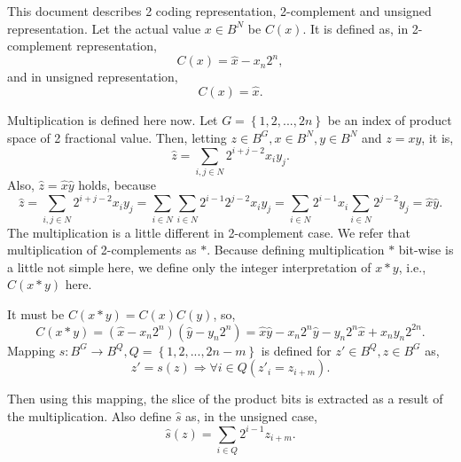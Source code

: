 \documentclass[a4paper]{article}
\newcommand{\eqlabel}[1]{\label{#1}
}
\newcommand{\br}[1]{\left(#1\right)}
\newcommand{\cbr}[1]{\left\{#1\right\}}
\newcommand{\hx}{{\hat{x}}}
\newcommand{\hy}{{\hat{y}}}
\newcommand{\hz}{{\hat{z}}}
\newcommand{\hs}{{\hat{s}}}
\begin{document}
This document describes 2 coding representation, 2-complement and unsigned representation. Let the actual value \(x\in B^N\) be \(C(x)\). It is defined as, in 2-complement representation, 
\begin{equation}
    \eqlabel{eC0}
C(x) = \hx - x_n 2^n,
\end{equation}
and in unsigned representation, 
\begin{equation}
    \eqlabel{eC1}
C(x) = \hx.
\end{equation}

Multiplication is defined here now. Let \(G = \cbr{1, 2,..., 2n}\) be an index of product space of 2 fractional value. Then, letting \(z\in B^G, x\in B^N, y\in B^N\) and \(z=xy\), it is,
\[
    \hz = \sum_{i, j\in N} 2^{i+j-2} x_i y_j.
\]
Also, \(\hz = \hx\hy\) holds, because
\begin{equation}
    \eqlabel{eMulHom}
    \hz = \sum_{i, j\in N} 2^{i+j-2} x_i y_j = \sum_{i\in N}\sum_{i\in N} 2^{i -1}2^{j-2} x_i y_j = \sum_{i\in N}2^{i -1} x_i\sum_{i\in N}  2^{j-2}y_j =  \hx \hy.
\end{equation}
The multiplication is a little different in 2-complement case. We refer that multiplication of 2-complements as \(*\). Because defining multiplication \(*\) bit-wise is a little not simple here, we define only the integer interpretation of \(x*y\), i.e., \(C(x*y)\) here.

It must be \(C(x*y) = C(x)C(y)\), so,
\begin{equation}
    \eqlabel{eC}
    C(x*y) =  \br{\hx - x_n 2^{n}} \br{\hy - y_n 2^{n}} = \hx\hy - x_n 2^n \hy - y_n 2^n \hx + x_n y_n 2^{2n}.
\end{equation}
Mapping \(s: B^G \to B^Q, Q = \cbr{1,2,...,2n-m}\) is defined for \(z'\in B^Q, z\in B^{G}\) as,
\[
    z' = s(z) \Rightarrow \forall i\in Q\br{z'_i = z_{i + m}}.
\]

Then using this mapping, the slice of the product bits is extracted as a result of the multiplication. Also define \(\hs\) as, in the unsigned case,
\begin{equation}
    \eqlabel{ehs}
    \hs(z) = \sum_{i\in Q} 2^{i-1} z_{i+m}.
\end{equation}
\end{document}
